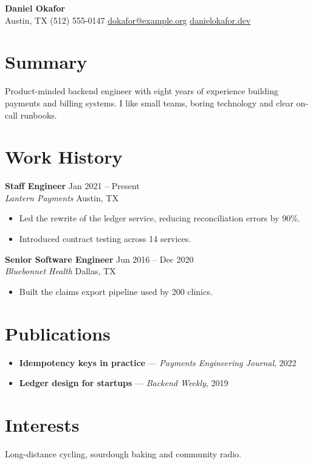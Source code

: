 \documentclass[11pt]{article}
\begin{document}
\begin{center}
{\LARGE \textbf{Daniel Okafor}} \\[4pt]
Austin, TX \textbar{} (512) 555-0147 \textbar{} \href{mailto:dokafor@example.org}{dokafor@example.org} \textbar{} \href{https://danielokafor.dev}{danielokafor.dev}
\end{center}

\section*{Summary}
Product-minded backend engineer with eight years of experience building payments and billing systems. I like small teams, boring technology and clear on-call runbooks.

\section*{Work History}
\textbf{Staff Engineer} \hfill Jan 2021 -- Present \\
\textit{Lantern Payments} \hfill Austin, TX
\begin{itemize}[noitemsep]
  \item Led the rewrite of the ledger service, reducing reconciliation errors by 90\%.
  \item Introduced contract testing across 14 services.
\end{itemize}

\textbf{Senior Software Engineer} \hfill Jun 2016 -- Dec 2020 \\
\textit{Bluebonnet Health} \hfill Dallas, TX
\begin{itemize}[noitemsep]
  \item Built the claims export pipeline used by 200 clinics.
\end{itemize}

\section*{Publications}
\begin{itemize}[noitemsep]
  \item \textbf{Idempotency keys in practice} --- \textit{Payments Engineering Journal}, 2022
  \item \textbf{Ledger design for startups} --- \textit{Backend Weekly}, 2019
\end{itemize}

\section*{Interests}
Long-distance cycling, sourdough baking and community radio.
\end{document}
